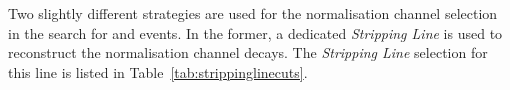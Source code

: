 



%

              








Two slightly different strategies are used for the normalisation channel selection in the search for \decay{\Bp}{\Dsp\phiz} and \decay{\Bp}{\Dsp\Kp\Km} events.
In the former, a dedicated \decay{\Bp}{\Dsp\Dzb} \emph{Stripping Line} is used to reconstruct the normalisation channel decays.
The \emph{Stripping Line} selection for this line is listed in Table~\ref{tab:strippinglinecuts}.

%    

